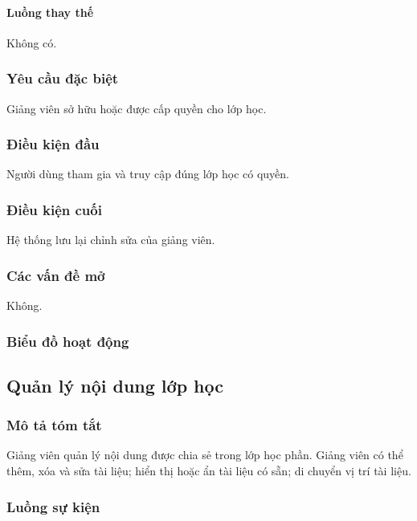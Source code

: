 \documentclass[./../main_file.tex]{subfiles}
\begin{document}
\paragraph{Luồng thay thế}
	Không có.

\subsubsection{Yêu cầu đặc biệt}
Giảng viên sở hữu hoặc được cấp quyền cho lớp học.

\subsubsection{Điều kiện đầu}
Người dùng tham gia và truy cập đúng lớp học có quyền.

\subsubsection{Điều kiện cuối}
Hệ thống lưu lại chỉnh sửa của giảng viên.

\subsubsection{Các vấn đề mở}
Không.

\subsubsection{Biểu đồ hoạt động}

\subsection{Quản lý nội dung lớp học}
\subsubsection{Mô tả tóm tắt}
Giảng viên quản lý nội dung được chia sẻ trong lớp học phần. Giảng viên có thể thêm, xóa và sửa tài liệu; hiển thị hoặc ẩn tài liệu có sẵn; di chuyển vị trí tài liệu.
\subsubsection{Luồng sự kiện}
\end{document}
